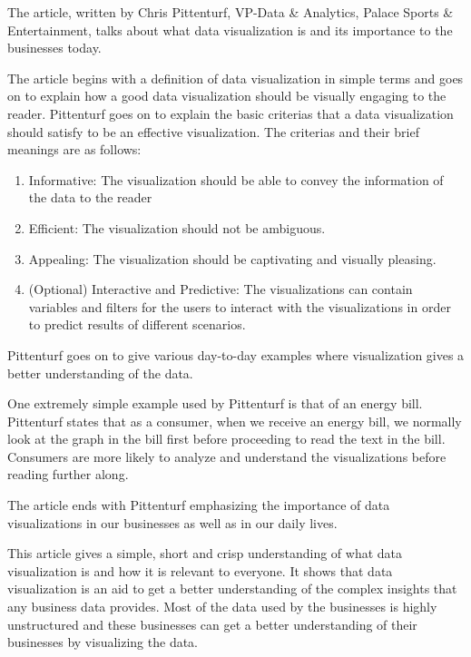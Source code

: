 \documentclass[]{book}
\providecommand{\tightlist}{%
  \setlength{\itemsep}{0pt}\setlength{\parskip}{0pt}}
\theoremstyle{definition}
\theoremstyle{definition}
\theoremstyle{definition}
\theoremstyle{remark}
\begin{document}
The article, written by Chris Pittenturf, VP-Data \& Analytics, Palace
Sports \& Entertainment, talks about what data visualization is and its
importance to the businesses today.

The article begins with a definition of data visualization in simple
terms and goes on to explain how a good data visualization should be
visually engaging to the reader. Pittenturf goes on to explain the basic
criterias that a data visualization should satisfy to be an effective
visualization. The criterias and their brief meanings are as follows:

\begin{enumerate}
\def\labelenumi{\arabic{enumi}.}
\tightlist
\item
  Informative: The visualization should be able to convey the
  information of the data to the reader
\item
  Efficient: The visualization should not be ambiguous.
\item
  Appealing: The visualization should be captivating and visually
  pleasing.
\item
  (Optional) Interactive and Predictive: The visualizations can contain
  variables and filters for the users to interact with the
  visualizations in order to predict results of different scenarios.
\end{enumerate}

Pittenturf goes on to give various day-to-day examples where
visualization gives a better understanding of the data.

One extremely simple example used by Pittenturf is that of an energy
bill. Pittenturf states that as a consumer, when we receive an energy
bill, we normally look at the graph in the bill first before proceeding
to read the text in the bill. Consumers are more likely to analyze and
understand the visualizations before reading further along.

The article ends with Pittenturf emphasizing the importance of data
visualizations in our businesses as well as in our daily lives.

This article gives a simple, short and crisp understanding of what data
visualization is and how it is relevant to everyone. It shows that data
visualization is an aid to get a better understanding of the complex
insights that any business data provides. Most of the data used by the
businesses is highly unstructured and these businesses can get a better
understanding of their businesses by visualizing the data.
\end{document}

